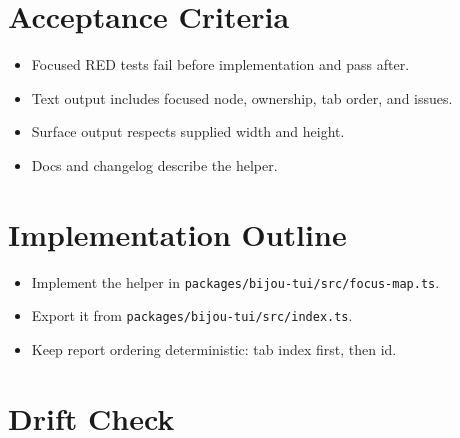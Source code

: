 \section{Acceptance Criteria}\label{record-257-acceptance-criteria}

\begin{itemize}
\tightlist
\item
  Focused RED tests fail before implementation and pass after.
\item
  Text output includes focused node, ownership, tab order, and issues.
\item
  Surface output respects supplied width and height.
\item
  Docs and changelog describe the helper.
\end{itemize}

\section{Implementation Outline}\label{record-257-implementation-outline}

\begin{itemize}
\tightlist
\item
  Implement the helper in \texttt{p\allowbreak{}a\allowbreak{}c\allowbreak{}k\allowbreak{}a\allowbreak{}g\allowbreak{}e\allowbreak{}s\allowbreak{}/\allowbreak{}b\allowbreak{}i\allowbreak{}j\allowbreak{}o\allowbreak{}u\allowbreak{}-\allowbreak{}t\allowbreak{}u\allowbreak{}i\allowbreak{}/\allowbreak{}s\allowbreak{}r\allowbreak{}c\allowbreak{}/\allowbreak{}f\allowbreak{}o\allowbreak{}c\allowbreak{}u\allowbreak{}s\allowbreak{}-\allowbreak{}m\allowbreak{}a\allowbreak{}p\allowbreak{}.\allowbreak{}t\allowbreak{}s}.
\item
  Export it from \texttt{p\allowbreak{}a\allowbreak{}c\allowbreak{}k\allowbreak{}a\allowbreak{}g\allowbreak{}e\allowbreak{}s\allowbreak{}/\allowbreak{}b\allowbreak{}i\allowbreak{}j\allowbreak{}o\allowbreak{}u\allowbreak{}-\allowbreak{}t\allowbreak{}u\allowbreak{}i\allowbreak{}/\allowbreak{}s\allowbreak{}r\allowbreak{}c\allowbreak{}/\allowbreak{}i\allowbreak{}n\allowbreak{}d\allowbreak{}e\allowbreak{}x\allowbreak{}.\allowbreak{}t\allowbreak{}s}.
\item
  Keep report ordering deterministic: tab index first, then id.
\end{itemize}

\section{Drift Check}\label{record-257-drift-check}

